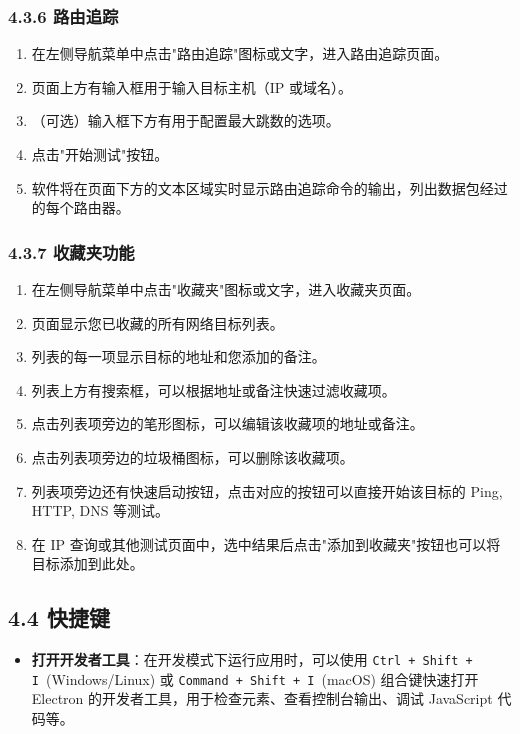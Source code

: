 \documentclass{article}
\begin{document}
\subsubsection*{4.3.6 路由追踪}

\begin{enumerate}[label=\arabic*.]
    \item 在左侧导航菜单中点击"路由追踪"图标或文字，进入路由追踪页面。
    \item 页面上方有输入框用于输入目标主机（IP 或域名）。
    \item （可选）输入框下方有用于配置最大跳数的选项。
    \item 点击"开始测试"按钮。
    \item 软件将在页面下方的文本区域实时显示路由追踪命令的输出，列出数据包经过的每个路由器。
\end{enumerate}

\subsubsection*{4.3.7 收藏夹功能}

\begin{enumerate}[label=\arabic*.]
    \item 在左侧导航菜单中点击"收藏夹"图标或文字，进入收藏夹页面。
    \item 页面显示您已收藏的所有网络目标列表。
    \item 列表的每一项显示目标的地址和您添加的备注。
    \item 列表上方有搜索框，可以根据地址或备注快速过滤收藏项。
    \item 点击列表项旁边的笔形图标，可以编辑该收藏项的地址或备注。
    \item 点击列表项旁边的垃圾桶图标，可以删除该收藏项。
    \item 列表项旁边还有快速启动按钮，点击对应的按钮可以直接开始该目标的 Ping, HTTP, DNS 等测试。
    \item 在 IP 查询或其他测试页面中，选中结果后点击"添加到收藏夹"按钮也可以将目标添加到此处。
\end{enumerate}

\subsection*{4.4 快捷键}

\begin{itemize}
    \item \textbf{打开开发者工具}：在开发模式下运行应用时，可以使用 \texttt{Ctrl + Shift + I}\ (Windows/Linux) 或 \texttt{Command + Shift + I}\ (macOS) 组合键快速打开 Electron 的开发者工具，用于检查元素、查看控制台输出、调试 JavaScript 代码等。
\end{itemize}
\end{document}
